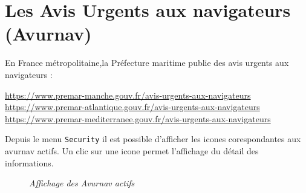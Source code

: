 \section{Les Avis Urgents aux navigateurs  ({\sc Avurnav})}
En France métropolitaine,la Préfecture maritime  publie des avis urgents aux navigateurs : 
\begin{center}
\begin{minipage}{14cm}
\href{https://www.premar-manche.gouv.fr/avis-urgents-aux-navigateurs}{https://www.premar-manche.gouv.fr/avis-urgents-aux-navigateurs}\\
\href{https://www.premar-atlantique.gouv.fr/avis-urgents-aux-navigateurs}{https://www.premar-atlantique.gouv.fr/avis-urgents-aux-navigateurs}\\
\href{https://www.premar-mediterranee.gouv.fr/avis-urgents-aux-navigateurs}{https://www.premar-mediterranee.gouv.fr/avis-urgents-aux-navigateurs}
\end{minipage}
\end{center}
Depuis le menu {\tt Security} il est possible d'afficher les icones corespondantes aux avurnav actifs. Un clic sur une icone permet l'affichage du détail des informations.
\begin{center}
\begin{figure}[ht]
\caption{\label{equiProj}\textit{Affichage des Avurnav actifs}}
\end{figure}
\end{center}
